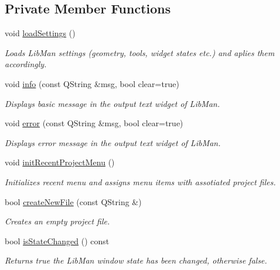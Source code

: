 \subsection*{Private Member Functions}
\begin{DoxyCompactItemize}
\item 
void \hyperlink{classMainWindow_a9bb1f3b7f6b5360abfd2dc01fc1c8930}{load\-Settings} ()
\begin{DoxyCompactList}\small\item\em Loads Lib\-Man settings (geometry, tools, widget states etc.) and aplies them accordingly. \end{DoxyCompactList}\item 
void \hyperlink{classMainWindow_adc87dcfb242d83a35794e011f8c29e41}{info} (const Q\-String \&msg, bool clear=true)
\begin{DoxyCompactList}\small\item\em Displays basic message in the output text widget of Lib\-Man. \end{DoxyCompactList}\item 
void \hyperlink{classMainWindow_aa3bc340f4289a4ef73e5feaa6c5b1a9a}{error} (const Q\-String \&msg, bool clear=true)
\begin{DoxyCompactList}\small\item\em Displays error message in the output text widget of Lib\-Man. \end{DoxyCompactList}\item 
void \hyperlink{classMainWindow_a5459d4fe95a19b1cf74aef261168c31d}{init\-Recent\-Project\-Menu} ()
\begin{DoxyCompactList}\small\item\em Initializes recent menu and assigns menu items with assotiated project files. \end{DoxyCompactList}\item 
bool \hyperlink{classMainWindow_a0045ab02ba4ef6bb3d777236983219bc}{create\-New\-File} (const Q\-String \&)
\begin{DoxyCompactList}\small\item\em Creates an empty project file. \end{DoxyCompactList}\item 
bool \hyperlink{classMainWindow_ab01cf882613a0b0ea2a35700be933143}{is\-State\-Changed} () const 
\begin{DoxyCompactList}\small\item\em Returns true the Lib\-Man window state has been changed, otherwise false. \end{DoxyCompactList}\item 

\end{DoxyCompactItemize}
